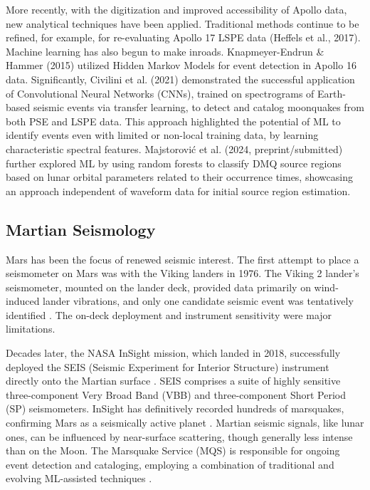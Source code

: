 \documentclass[conference]{IEEEtran}
\begin{document}
        More recently, with the digitization and improved accessibility of Apollo data, new analytical techniques have
        been applied. Traditional methods continue to be refined, for example, for re-evaluating Apollo 17 LSPE data
        (Heffels et al., 2017). Machine learning has also begun to make inroads. Knapmeyer-Endrun \& Hammer (2015)
        utilized Hidden Markov Models for event detection in Apollo 16 data. Significantly, Civilini et al. (2021)
        demonstrated the successful application of Convolutional Neural Networks (CNNs), trained on spectrograms of
        Earth-based seismic events via transfer learning, to detect and catalog moonquakes from both PSE and LSPE data.
        This approach highlighted the potential of ML to identify events even with limited or non-local training data,
        by learning characteristic spectral features. Majstorović et al. (2024, preprint/submitted) further explored ML
        by using random forests to classify DMQ source regions based on lunar orbital parameters related to their
        occurrence times, showcasing an approach independent of waveform data for initial source region estimation.

    \subsection{ Martian Seismology}
        Mars has been the focus of renewed seismic interest. The first attempt to place a seismometer on Mars was with
        the Viking landers in 1976. The Viking 2 lander's seismometer, mounted on the lander deck, provided data
        primarily on wind-induced lander vibrations, and only one candidate seismic event was tentatively identified
        \cite{Anderson1977,Lognonne2005}. The on-deck deployment and instrument sensitivity were major limitations.

        Decades later, the NASA InSight mission, which landed in 2018, successfully deployed the SEIS (Seismic
        Experiment for Interior Structure) instrument directly onto the Martian surface \cite{Lognonne2019, Banerdt2020}. 
        SEIS comprises a suite of highly sensitive three-component Very Broad Band (VBB) and three-component Short
        Period (SP) seismometers. InSight has definitively recorded hundreds of marsquakes, confirming Mars as a
        seismically active planet \cite{Giardini2020,Clinton2021}. Martian seismic signals, like lunar ones, can be
        influenced by near-surface scattering, though generally less intense than on the Moon. The Marsquake Service
        (MQS) is responsible for ongoing event detection and cataloging, employing a combination of traditional and
        evolving ML-assisted techniques \cite{Clinton2021}.
\end{document}
